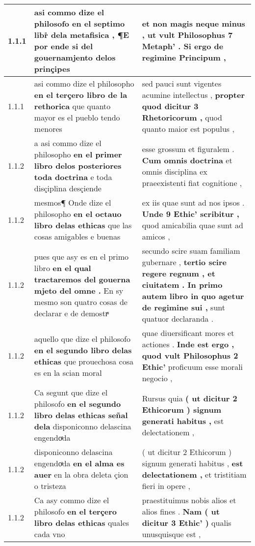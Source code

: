 \begin{tabular}{|p{1cm}|p{6.5cm}|p{6.5cm}|}

\hline
1.1.1 & asi commo dize el philosofo \textbf{ en el septimo libr̊ dela metafisica , } ¶E por ende si del gouernamjento delos prinçipes & et non magis neque minus , \textbf{ ut vult Philosophus 7 Metaph’ . } Si ergo de regimine Principum , \\\hline
1.1.1 & asi commo dize el philosopho \textbf{ en el terçero libro de la rethorica } que quanto mayor es el pueblo tendo menores & sed pauci sunt vigentes acumine intellectus , \textbf{ propter quod dicitur 3 Rhetoricorum , } quod quanto maior est populus , \\\hline
1.1.2 & a asi commo dize el philosopho \textbf{ en el primer libro delos posteriores toda doctrina } e toda disçiplina desçiende & esse grossum et figuralem . \textbf{ Cum omnis doctrina } et omnis disciplina ex praeexistenti fiat cognitione , \\\hline
1.1.2 & mesmos¶ Onde dize el philosopho \textbf{ en el octauo libro delas ethicas } que las cosas amigables e buenas & ex iis quae sunt ad nos ipsos . \textbf{ Unde 9 Ethic’ scribitur , } quod amicabilia quae sunt ad amicos , \\\hline
1.1.2 & pues que asy es en el primo libro \textbf{ en el qual tractaremos del gouerna mjeto del omne . } En sy mesmo son quatro cosas de declarar e de demostrͣ & secundo scire suam familiam gubernare , \textbf{ tertio scire regere regnum , et ciuitatem . In primo autem libro in quo agetur de regimine sui , } sunt quatuor declaranda . \\\hline
1.1.2 & aquello que dize el philosofo \textbf{ en el segundo libro delas ethicas } que prouechosa cosa es en la scian moral & quae diuersificant mores et actiones . \textbf{ Inde est ergo , quod vult Philosophus 2 Ethic’ } proficuum esse morali negocio , \\\hline
1.1.2 & Ca segunt que dize el philosofo \textbf{ en el segundo libro delas ethicas señal dela } disponiconno delascina engendoͣda & Rursus quia \textbf{ ( ut dicitur 2 Ethicorum ) signum generati habitus , } est delectationem , \\\hline
1.1.2 & disponiconno delascina engendoͣda \textbf{ en el alma es auer } en la obra deleta çion o tristeza & ( ut dicitur 2 Ethicorum ) signum generati habitus , \textbf{ est delectationem , } et tristitiam fieri in opere , \\\hline
1.1.2 & Ca asy commo dize el philosofo \textbf{ en el terçero libro delas ethicas } quales cada vno & praestituimus nobis alios et alios fines . \textbf{ Nam ( ut dicitur 3 Ethic’ ) } qualis unusquisque est , \\\hline

\end{tabular}
